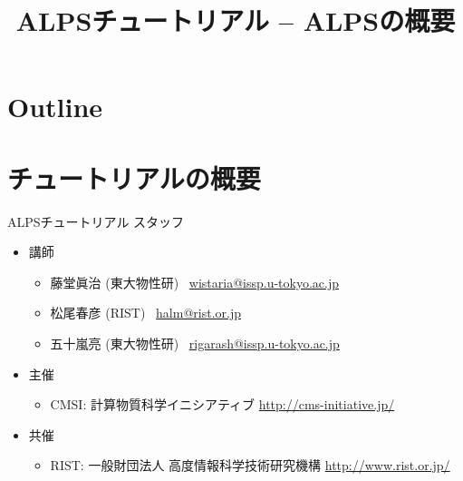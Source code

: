 \title{ALPSチュートリアル -- ALPSの概要}



\begin{frame}
  \titlepage
\end{frame}

\section*{Outline}
\begin{frame}
  \tableofcontents
\end{frame}


\section{チュートリアルの概要}

\begin{frame}{ALPSチュートリアル スタッフ}
  \begin{itemize}
  \item 講師
    \begin{itemize}
    \item 藤堂眞治 (東大物性研) \ \href{mailto:wistaria@issp.u-tokyo.ac.jp}{wistaria@issp.u-tokyo.ac.jp}
    \item 松尾春彦 (RIST) \ \href{mailto:halm@rist.or.jp}{halm@rist.or.jp}
    \item 五十嵐亮 (東大物性研) \ \href{mailto:rigarash@issp.u-tokyo.ac.jp}{rigarash@issp.u-tokyo.ac.jp}
    \end{itemize}
  \item 主催
    \begin{itemize}
    \item CMSI: 計算物質科学イニシアティブ \url{http://cms-initiative.jp/}
    \end{itemize}
  \item 共催
    \begin{itemize}
    \item RIST: 一般財団法人 高度情報科学技術研究機構 \url{http://www.rist.or.jp/}
    \end{itemize}
  \end{itemize}
\end{frame}

